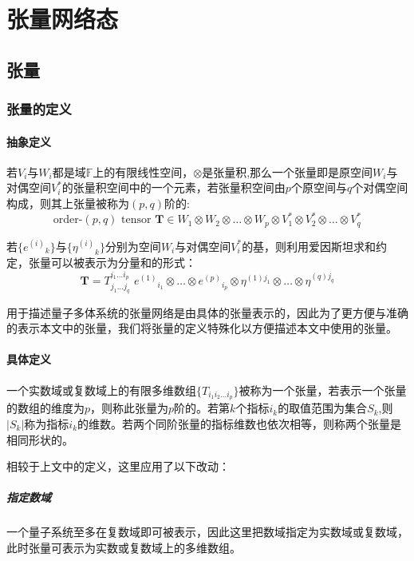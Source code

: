 
\chapter{张量网络态}

\section{张量}

\subsection{张量的定义}

\subsubsection{抽象定义}

若$V_i$与$W_i$都是域$\mathbb{F}$上的有限线性空间，$\otimes$是张量积,那么一个张量即是原空间$W_i$与对偶空间$V^*_i$的张量积空间中的一个元素，若张量积空间由$p$个原空间与$q$个对偶空间构成，则其上张量被称为$(p,q)$阶的:
\[
\text{order-}(p,q) \text{ tensor } \symbf{T} \in W_1 \otimes W_2 \otimes \dots \otimes W_p 
\otimes V^*_1 \otimes V^*_2 \otimes \dots \otimes V^*_q
\]

若$\{{e^{(i)}}_k\}$与$\{{\eta^{(i)}}_k\}$分别为空间$W_i$与对偶空间$V^*_i$的基，则利用爱因斯坦求和约定，张量可以被表示为分量和的形式：
\[
\symbf{T}=T^{i_1\dots i_p}_{j_1\dots j_q} \,\, {e^{(1)}}_{i_1}\otimes\dots\otimes{e^{(p)}}_{i_p}
\otimes {\eta^{(1)j_1}}\otimes\dots\otimes{\eta^{(q)j_q}}
\]

用于描述量子多体系统的张量网络是由具体的张量表示的，因此为了更方便与准确的表示本文中的张量，我们将张量的定义特殊化以方便描述本文中使用的张量。

\subsubsection{具体定义}

一个实数域或复数域上的有限多维数组$\{T_{i_1 i_2\dots i_p}\}$被称为一个张量，若表示一个张量的数组的维度为$p$，则称此张量为$p$阶的。若第$k$个指标$i_k$的取值范围为集合$S_{k}$,则$\lvert S_{k}\rvert$称为指标$i_k$的维数。若两个同阶张量的指标维数也依次相等，则称两个张量是相同形状的。

相较于上文中的定义，这里应用了以下改动：
\paragraph{指定数域}
一个量子系统至多在复数域即可被表示，因此这里把数域指定为实数域或复数域，此时张量可表示为实数或复数域上的多维数组。
